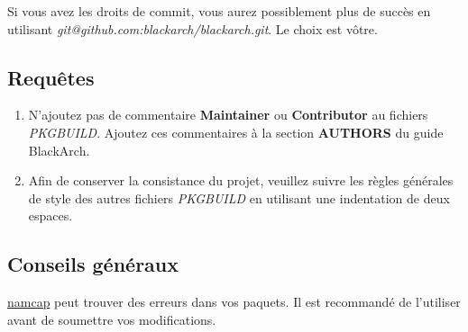 \documentclass[a4paper, oneside, 11pt]{book}
\begin{document}
Si vous avez les droits de commit, vous aurez possiblement plus de succès en
utilisant \textit{git@github.com:blackarch/blackarch.git}. Le choix est vôtre.

\subsection{Requêtes}
\begin{enumerate}
\item N'ajoutez pas de commentaire \textbf{Maintainer} ou \textbf{Contributor}
au fichiers \textit{PKGBUILD}. Ajoutez ces commentaires à la section
\textbf{AUTHORS} du guide BlackArch.
\item Afin de conserver la consistance du projet, veuillez suivre les règles
générales de style des autres fichiers \textit{PKGBUILD} en utilisant une
indentation de deux espaces.
\end{enumerate}

\subsection{Conseils généraux}
\href{http://wiki.archlinux.org/index.php/Namcap}{namcap} peut trouver des
erreurs dans vos paquets. Il est recommandé de l'utiliser avant de soumettre vos
modifications.

\appendix

\end{document}
